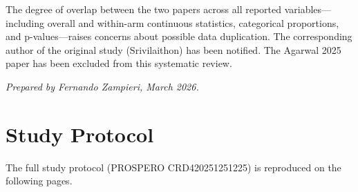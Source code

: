 \documentclass[11pt]{article}
\begin{document}
The degree of overlap between the two papers across all reported variables---including overall and within-arm continuous statistics, categorical proportions, and p-values---raises concerns about possible data duplication. The corresponding author of the original study (Srivilaithon) has been notified. The Agarwal 2025 paper has been excluded from this systematic review.

\vspace{4pt}
\noindent\textit{Prepared by Fernando Zampieri, March 2026.}

\newpage

\section{Study Protocol}
\label{sec:protocol}

The full study protocol (PROSPERO CRD420251251225) is reproduced on the following pages.


\end{document}
